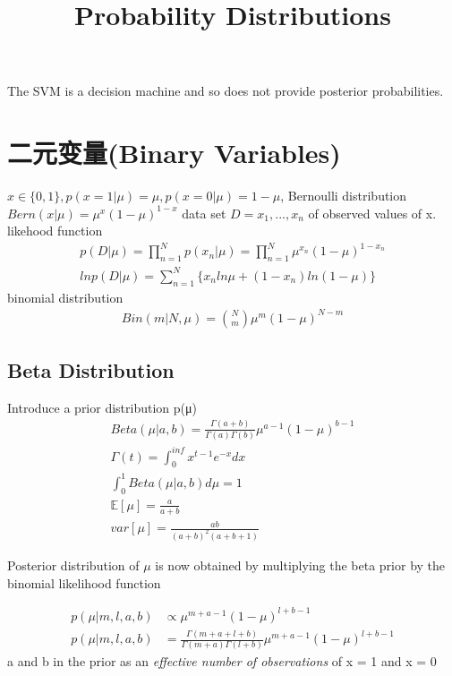 \documentclass[a4paper]{article}
\begin{document}
\title{Probability Distributions}
\author{}
\maketitle

The SVM is a decision machine and so does not provide posterior probabilities.
\section{二元变量(Binary Variables)}
$x \in \{0,1\}, p(x=1|\mu) = \mu, p(x=0|\mu) = 1-\mu$, Bernoulli distribution $Bern(x|\mu) = \mu^x(1-\mu)^{1-x}$
data set $D = {x_1,...,x_n}$ of observed values of x. likehood function
\begin{align}
p(D|\mu) = \prod_{n=1}^N p(x_n|\mu) = \prod_{n=1}^N \mu^{x_n}(1-\mu)^{1-x_n}\\
ln p(D|\mu) = \sum_{n=1}^N \{ x_nln\mu + (1-x_n)ln(1-\mu) \}
\end{align}
binomial distribution
\begin{align}
  Bin(m|N,\mu) = {N \choose m} \mu^m (1-\mu)^{N-m}
\end{align}

\subsection{Beta Distribution}

Introduce a prior distribution p(μ)
\begin{align}
  Beta(\mu|a,b) = \frac{ \Gamma(a+b) } {\Gamma(a)\Gamma(b)} \mu^{a-1} (1-\mu)^{b-1}\\
  \Gamma(t) = \int_0^{inf} x^{t-1}e^{-x} dx\\
  \int_0^1 Beta(\mu|a,b) d\mu = 1\\
  \mathbb{E}[\mu] = \frac{a}{a+b}\\
  var[\mu] = \frac{ab}{(a+b)^2(a+b+1)}
\end{align}

Posterior distribution of $\mu$ is now obtained by multiplying the beta prior by the binomial likelihood function

\begin{align*}
  p(\mu|m,l,a,b) &\propto \mu^{m+a-1} (1-\mu)^{l+b-1}\\
  p(\mu|m,l,a,b) &=  \frac{ \Gamma(m+a+l+b) } {\Gamma(m+a)\Gamma(l+b)} \mu^{m+a-1} (1-\mu)^{l+b-1}
\end{align*}
a and b in the prior as an \textit{effective number of observations} of x = 1 and x = 0
\end{document}
